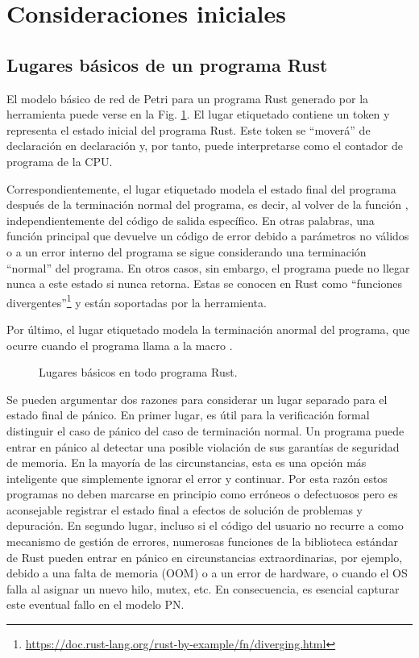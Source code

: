 \section{Consideraciones iniciales}

\subsection{Lugares básicos de un programa Rust}
\label{sec:basic-places}

El modelo básico de red de Petri para un programa Rust generado por la herramienta puede
verse en la Fig. \ref{fig:program-places}.
El lugar etiquetado  contiene un token y representa el
estado inicial del programa Rust. Este token se ``moverá'' de declaración en declaración y, por
tanto, puede interpretarse como el contador de programa de la \acrshort{CPU}.

Correspondientemente, el lugar etiquetado  modela el estado final del programa
después de la terminación normal del programa, es decir, al volver de la función
, independientemente del código de salida específico.
En otras palabras, una función principal que devuelve un código de error debido a parámetros no válidos o a un error interno del
programa se sigue considerando una terminación ``normal'' del programa.
En otros casos, sin embargo, el programa puede no llegar nunca a este estado si  nunca retorna.
Estas se conocen en Rust como ``funciones divergentes''\footnote{\url{https://doc.rust-lang.org/rust-by-example/fn/diverging.html}}
y están soportadas por la herramienta.

Por último, el lugar etiquetado  modela
la terminación anormal del programa,
que ocurre cuando el programa llama a la macro .

\begin{figure}[!htb]
  \centering
  
  \caption{Lugares básicos en todo programa Rust.}
  \label{fig:program-places}
\end{figure}

Se pueden argumentar dos razones para considerar un lugar separado para el estado final de pánico.
En primer lugar, es útil para la verificación formal distinguir el caso de pánico del caso
de terminación normal. Un programa puede entrar en pánico al detectar una posible violación
de sus garantías de seguridad de memoria. En la mayoría de las circunstancias, esta es una
opción más inteligente que simplemente ignorar el error y continuar. Por esta razón estos
programas no deben marcarse en principio como erróneos o defectuosos pero es aconsejable
registrar el estado final a efectos de solución de problemas y depuración. En segundo lugar,
incluso si el código del usuario no recurre a  como mecanismo de gestión de errores,
numerosas funciones de la biblioteca estándar de Rust pueden entrar en pánico en
circunstancias extraordinarias, por ejemplo, debido a una falta de memoria (\acrfull{OOM}) o a un
error de hardware, o cuando el \acrshort{OS} falla al asignar un nuevo hilo, mutex, etc. En
consecuencia, es esencial capturar este eventual fallo en el modelo \acrshort{PN}.

